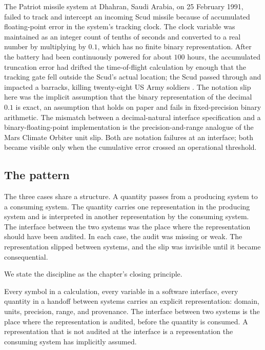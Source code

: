 The Patriot missile system at Dhahran, Saudi Arabia, on 25 February
1991, failed to track and intercept an incoming Scud missile because
of accumulated floating-point error in the system's tracking clock.
The clock variable was maintained as an integer count of tenths of
seconds and converted to a real number by multiplying by $0.1$,
which has no finite binary representation. After the battery had
been continuously powered for about $100$ hours, the accumulated
truncation error had drifted the time-of-flight calculation by
enough that the tracking gate fell outside the Scud's actual
location; the Scud passed through and impacted a barracks, killing
twenty-eight US Army soldiers \cite{acc:gao-patriot-1992}. The
notation slip here was the implicit assumption that the binary
representation of the decimal $0.1$ is exact, an assumption that
holds on paper and fails in fixed-precision binary arithmetic. The
mismatch between a decimal-natural interface specification and a
binary-floating-point implementation is the precision-and-range
analogue of the Mars Climate Orbiter unit slip. Both are notation
failures at an interface; both became visible only when the
cumulative error crossed an operational threshold.

\subsection{The pattern}

The three cases share a structure. A quantity passes from a
producing system to a consuming system. The quantity carries one
representation in the producing system and is interpreted in another
representation by the consuming system. The interface between the
two systems was the place where the representation should have been
audited. In each case, the audit was missing or weak. The
representation slipped between systems, and the slip was invisible
until it became consequential.

We state the discipline as the chapter's closing principle.

\begin{principle}
Every symbol in a calculation, every variable in a software
interface, every quantity in a handoff between systems carries an
explicit representation: domain, units, precision, range, and
provenance. The interface between two systems is the place where the
representation is audited, before the quantity is consumed. A
representation that is not audited at the interface is a
representation the consuming system has implicitly assumed.
\end{principle}

